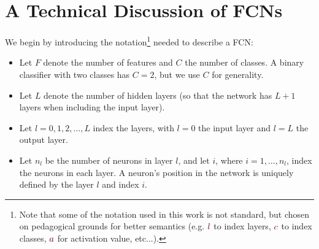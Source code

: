 \documentclass[11pt, a4paper]{article}
\newcommand{\myhref}[2]{\hyperref[#1]{\textcolor{blue}{#2}}}
\begin{document}
\newpage
\appendix
\section{A Technical Discussion of FCNs} \label{s:appendix-fcn}
We begin by introducing the notation\footnote{Note that some of the notation used in this work is not standard, but chosen on pedagogical grounds for better semantics (e.g. $ {\color{myMaroon} l} $ to index {\color{myMaroon} l}ayers, $ {\color{myMaroon} c} $ to index {\color{myMaroon} c}lasses, $ {\color{myMaroon} a} $ for {\color{myMaroon} a}ctivation value, etc...).} needed to describe a FCN:
\begin{itemize}

    \item Let $ F $ denote the number of features and $ C $ the number of classes. A binary classifier with two classes has $ C = 2 $, but we use $ C $ for generality.

    \item Let $ L $ denote the number of hidden layers (so that the network has $ L + 1 $ layers when including the input layer).

    \item Let $ l = 0, 1, 2, ..., L $ index the layers, with $ l = 0 $ the input layer and $ l = L $ the output layer.

    \item Let $ n_{l} $ be the number of neurons in layer $ l $, and let $ i $, where $ i = 1, \ldots, n_{l} $, index the neurons in each layer. A neuron's position in the network is uniquely defined by the layer $ l $ and index $ i $.


\end{itemize}
\end{document}
